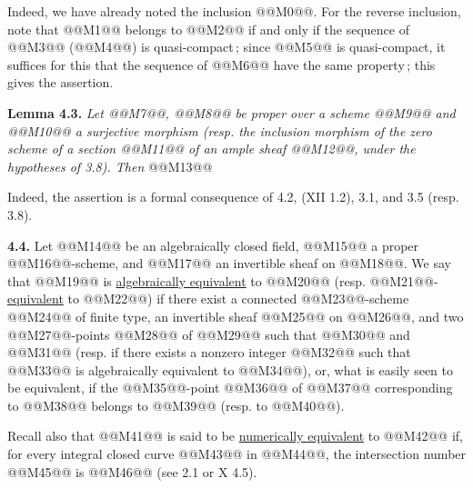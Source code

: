 Indeed, we have already noted the inclusion @@M0@@. For the reverse inclusion, note that @@M1@@ belongs to @@M2@@ if and only if the sequence of @@M3@@ (@@M4@@) is quasi-compact\,; since @@M5@@ is quasi-compact, it suffices for this that the sequence of @@M6@@ have the same property\,; this gives the assertion.

\textbf{Lemma 4.3.} \emph{Let @@M7@@, @@M8@@ be proper over a scheme @@M9@@ and @@M10@@ a surjective morphism (resp. the inclusion morphism of the zero scheme of a section @@M11@@ of an ample sheaf @@M12@@, under the hypotheses of 3.8). Then}
@@M13@@

Indeed, the assertion is a formal consequence of 4.2, (XII 1.2), 3.1, and 3.5 (resp. 3.8).

\textbf{4.4.} Let @@M14@@ be an algebraically closed field, @@M15@@ a proper @@M16@@-scheme, and @@M17@@ an invertible sheaf on @@M18@@. We say that @@M19@@ is \uline{algebraically equivalent} to @@M20@@ (resp. @@M21@@-\uline{equivalent} to @@M22@@) if there exist a connected @@M23@@-scheme @@M24@@ of finite type, an invertible sheaf @@M25@@ on @@M26@@, and two @@M27@@-points @@M28@@ of @@M29@@ such that @@M30@@ and @@M31@@ (resp. if there exists a nonzero integer @@M32@@ such that @@M33@@ is algebraically equivalent to @@M34@@), or, what is easily seen to be equivalent, if the @@M35@@-point @@M36@@ of @@M37@@ corresponding to @@M38@@ belongs to @@M39@@ (resp. to @@M40@@).

Recall also that @@M41@@ is said to be \uline{numerically equivalent} to @@M42@@ if, for every integral closed curve @@M43@@ in @@M44@@, the intersection number @@M45@@ is @@M46@@ (see 2.1 or X 4.5).

